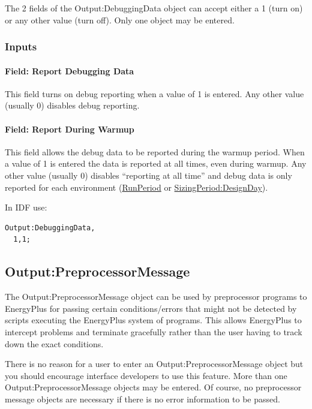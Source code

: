 The 2 fields of the Output:DebuggingData object can accept either a 1 (turn on) or any other value (turn off). Only one object may be entered.

\subsubsection{Inputs}\label{inputs-12-017}

\paragraph{Field: Report Debugging Data}\label{field-report-debugging-data}

This field turns on debug reporting when a value of 1 is entered. Any other value (usually 0) disables debug reporting.

\paragraph{Field: Report During Warmup}\label{field-report-during-warmup}

This field allows the debug data to be reported during the warmup period. When a value of 1 is entered the data is reported at all times, even during warmup. Any other value (usually 0) disables ``reporting at all time'' and debug data is only reported for each environment (\hyperref[runperiod]{RunPeriod} or \hyperref[sizingperioddesignday]{SizingPeriod:DesignDay}).

In IDF use:

\begin{lstlisting}
Output:DebuggingData,
  1,1;
\end{lstlisting}

\subsection{Output:PreprocessorMessage}\label{outputpreprocessormessage}

The Output:PreprocessorMessage object can be used by preprocessor programs to EnergyPlus for passing certain conditions/errors that might not be detected by scripts executing the EnergyPlus system of programs. This allows EnergyPlus to intercept problems and terminate gracefully rather than the user having to track down the exact conditions.

There is no reason for a user to enter an Output:PreprocessorMessage object but you should encourage interface developers to use this feature. More than one Output:PreprocessorMessage objects may be entered. Of course, no preprocessor message objects are necessary if there is no error information to be passed.

